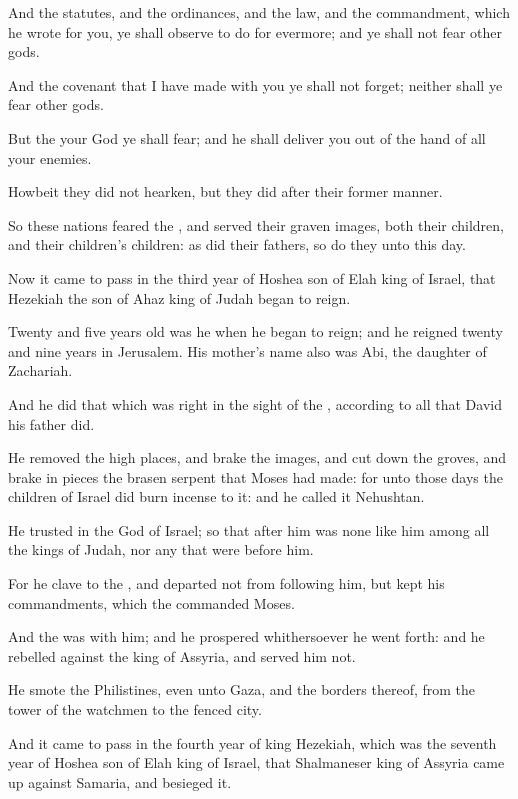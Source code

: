 \Verse And the statutes, and the ordinances, and the law, and the commandment, which he wrote for you, ye shall observe to do for evermore; and ye shall not fear other gods.

\Verse And the covenant that I have made with you ye shall not forget; neither shall ye fear other gods.

\Verse But the \LORD your God ye shall fear; and he shall deliver you out of the hand of all your enemies.

\Verse Howbeit they did not hearken, but they did after their former manner.

\Verse So these nations feared the \LORD, and served their graven images, both their children, and their children's children: as did their fathers, so do they unto this day.


\Chapter
\Verse Now it came to pass in the third year of Hoshea son of Elah king of Israel, that Hezekiah the son of Ahaz king of Judah began to reign.

\Verse Twenty and five years old was he when he began to reign; and he reigned twenty and nine years in Jerusalem. His mother's name also was Abi, the daughter of Zachariah.

\Verse And he did that which was right in the sight of the \LORD, according to all that David his father did.

\Verse He removed the high places, and brake the images, and cut down the groves, and brake in pieces the brasen serpent that Moses had made: for unto those days the children of Israel did burn incense to it: and he called it Nehushtan.

\Verse He trusted in the \LORD God of Israel; so that after him was none like him among all the kings of Judah, nor any that were before him.

\Verse For he clave to the \LORD, and departed not from following him, but kept his commandments, which the \LORD commanded Moses.

\Verse And the \LORD was with him; and he prospered whithersoever he went forth: and he rebelled against the king of Assyria, and served him not.

\Verse He smote the Philistines, even unto Gaza, and the borders thereof, from the tower of the watchmen to the fenced city.

\Verse And it came to pass in the fourth year of king Hezekiah, which was the seventh year of Hoshea son of Elah king of Israel, that Shalmaneser king of Assyria came up against Samaria, and besieged it.

